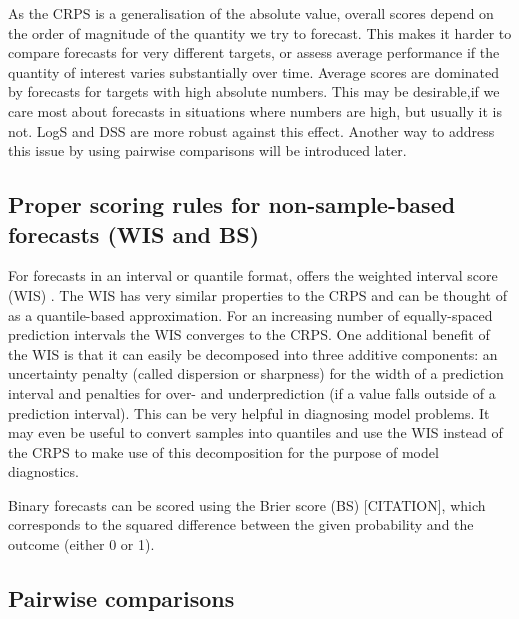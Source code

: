 \documentclass[article,shortnames]{jss}\usepackage[]{graphicx}\usepackage[]{color}
\begin{document}
As the CRPS is a generalisation of the absolute value, overall scores depend on the order of magnitude of the quantity we try to forecast. This makes it harder to compare forecasts for very different targets, or assess average performance if the quantity of interest varies substantially over time. Average scores are dominated by forecasts for targets with high absolute numbers. This may be desirable,if we care most about forecasts in situations where numbers are high, but usually it is not. LogS and DSS are more robust against this effect. Another way to address this issue by using pairwise comparisons will be introduced later. 

\subsection{Proper scoring rules for non-sample-based forecasts (WIS and BS)}
For forecasts in an interval or quantile format,  offers the weighted interval score (WIS) \citep{bracherEvaluatingEpidemicForecasts2021}. 
The WIS has very similar properties to the CRPS and can be thought of as a quantile-based approximation. For an increasing number of equally-spaced prediction intervals the WIS converges to the CRPS. One additional benefit of the WIS is that it can easily be decomposed into three additive components: an uncertainty penalty (called dispersion or sharpness) for the width of a prediction interval and penalties for over- and underprediction (if a value falls outside of a prediction interval). This can be very helpful in diagnosing model problems. It may even be useful to convert samples into quantiles and use the WIS instead of the CRPS to make use of this decomposition for the purpose of model diagnostics. 

Binary forecasts can be scored using the Brier score (BS) [CITATION], which corresponds to the squared difference between the given probability and the outcome (either 0 or 1). 

\subsection{Pairwise comparisons} 
\end{document}
